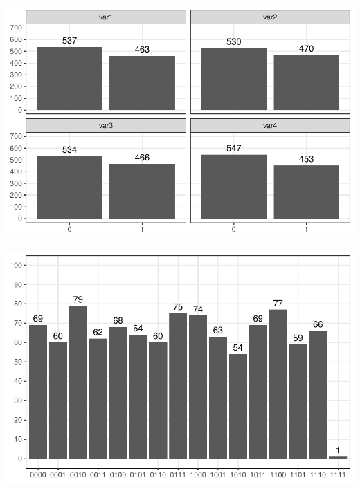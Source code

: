 \documentclass[t,8pt,utfx8]{beamer}
\begin{document}
\begin{spacing}{1.25}
{\begin{minipage}{0.48\textwidth}
    \centering
    \includegraphics[width=\textwidth]{../../graphs/graph_numeric_frequency.pdf}
\end{minipage}
\hfill
\begin{minipage}{0.48\textwidth}
    \centering
    \includegraphics[width=\textwidth]{../../graphs/graph_numeric_histogram.pdf}
\end{minipage}

}

\end{spacing}
\end{document}
